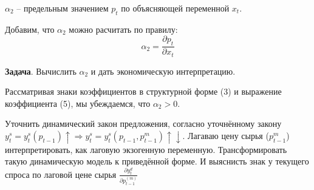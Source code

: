 \documentclass[12pt,a4paper]{article}
\begin{document}
$\alpha_2$ -- предельным значением $p_t$ по объясняющей переменной $x_t$.

Добавим, что $\alpha_2$ можно расчитать по правилу:
\begin{equation}
\alpha_2 = \frac{\partial p_t}{\partial x_t}
\end{equation}

\textbf{Задача}. Вычислить $\alpha_2$ и дать экономическую интерпретацию.

Рассматривая знаки коэффициентов в структурной форме (3) и выражение коэффициента (5), мы убеждаемся, что $\alpha_2 > 0$.

 Уточнить динамический закон предложения, согласно уточнённому закону
$y_t^s = y_t^s(p_{t-1})\uparrow  \Rightarrow y_t^s = y_t^s(p_{t-1}, p_{t-1}^m)\uparrow \downarrow$.
Лагаваю цену сырья ($p_{t-1}^m$) интерпретировать, как лаговую экзогенную переменную. Трансформировать такую динамическую модель к приведённой форме. И выяснисть знак у текущего спроса по лаговой цене сырья $\displaystyle{\frac{\partial y_t^d}{\partial p_{t-1}^{(m)}}}$
\end{document}
